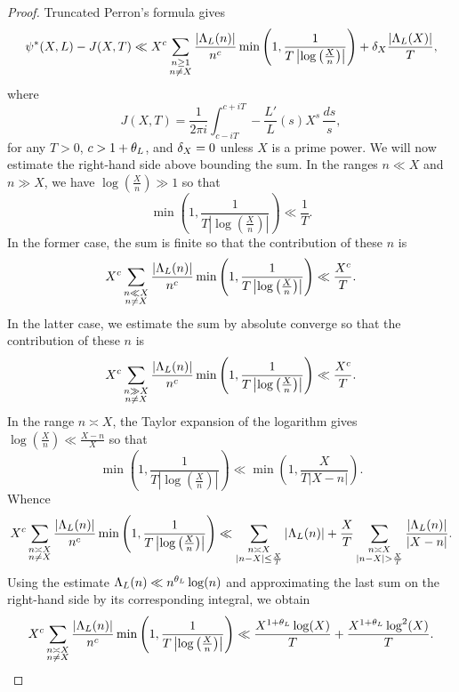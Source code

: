     \begin{proof}
      Truncated Perron's formula gives
      \[
        \psi^{\ast}(X,L)-J(X,T) \ll X^{c}\sum_{\substack{n \ge 1 \\ n \neq X}}\frac{|\Lambda_{L}(n)|}{n^{c}}\min\left(1,\frac{1}{T\left|\log\left(\frac{X}{n}\right)\right|}\right)+\delta_{X}\frac{|\Lambda_{L}(X)|}{T},
      \]
      where
      \[
        J(X,T) = \frac{1}{2\pi i}\int_{c-iT}^{c+iT}-\frac{L'}{L}(s)X^{s}\,\frac{ds}{s},
      \]
      for any \(T > 0\), \(c > 1+\theta_{L}\), and \(\delta_{X} = 0\) unless \(X\) is a prime power. We will now estimate the right-hand side above bounding the sum. In the ranges \(n \ll X\) and \(n \gg X\), we have \(\log\left(\frac{X}{n}\right) \gg 1\) so that
      \[
        \min\left(1,\frac{1}{T\left|\log\left(\frac{X}{n}\right)\right|}\right) \ll \frac{1}{T}.
      \]
      In the former case, the sum is finite so that the contribution of these \(n\) is
      \[
        X^{c}\sum_{\substack{n \ll X \\ n \neq X}}\frac{|\Lambda_{L}(n)|}{n^{c}}\min\left(1,\frac{1}{T\left|\log\left(\frac{X}{n}\right)\right|}\right) \ll \frac{X^{c}}{T}.
      \]
      In the latter case, we estimate the sum by absolute converge so that the contribution of these \(n\) is
      \[
        X^{c}\sum_{\substack{n \gg X \\ n \neq X}}\frac{|\Lambda_{L}(n)|}{n^{c}}\min\left(1,\frac{1}{T\left|\log\left(\frac{X}{n}\right)\right|}\right) \ll \frac{X^{c}}{T}.
      \]
      In the range \(n \asymp X\), the Taylor expansion of the logarithm gives \(\log\left(\frac{X}{n}\right) \ll \frac{X-n}{X}\) so that
      \[
        \min\left(1,\frac{1}{T\left|\log\left(\frac{X}{n}\right)\right|}\right) \ll \min\left(1,\frac{X}{T|X-n|}\right).
      \]
      Whence
      \[
        X^{c}\sum_{\substack{n \asymp X \\ n \neq X}}\frac{|\Lambda_{L}(n)|}{n^{c}}\min\left(1,\frac{1}{T\left|\log\left(\frac{X}{n}\right)\right|}\right) \ll \sum_{\substack{n \asymp X \\ |n-X| \le \frac{X}{T}}}|\Lambda_{L}(n)|+\frac{X}{T}\sum_{\substack{n \asymp X \\ |n-X| > \frac{X}{T}}}\frac{|\Lambda_{L}(n)|}{|X-n|}.
      \]
      Using the estimate \(\Lambda_{L}(n) \ll n^{\theta_{L}}\log(n)\) and approximating the last sum on the right-hand side by its corresponding integral, we obtain
      \[
        X^{c}\sum_{\substack{n \asymp X \\ n \neq X}}\frac{|\Lambda_{L}(n)|}{n^{c}}\min\left(1,\frac{1}{T\left|\log\left(\frac{X}{n}\right)\right|}\right) \ll 
        \frac{X^{1+\theta_{L}}\log(X)}{T}+\frac{X^{1+\theta_{L}}\log^{2}(X)}{T}.
\]
\end{proof}
